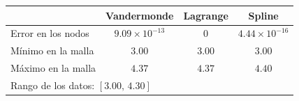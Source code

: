 \begin{tabular}{lccc}
  \toprule
  \rowcolor{Azul1!50}
   & Vandermonde & Lagrange & Spline \\
  \midrule
  Error en los nodos & $9.09\times10^{-13}$ & 0 & $4.44\times10^{-16}$ \\
  Mínimo en la malla & $3.00$ & $3.00$ & $3.00$ \\
  Máximo en la malla & $4.37$ & $4.37$ & $4.40$ \\
  \midrule
  \multicolumn{4}{l}{Rango de los datos: $[3.00,\,4.30]$} \\
  \bottomrule
\end{tabular}
